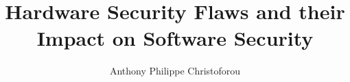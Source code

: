 \documentclass{template}
\begin{document}

\title{\huge{Hardware Security Flaws and their Impact on Software Security}}
\author{Anthony Philippe Christoforou}


\lstlistoflistings  










\footnotesize  %
\printbibliography
\normalsize
\appendix
\end{document}
